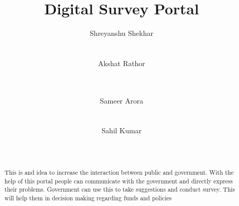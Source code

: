 \documentclass{sig-alternate}
\begin{document}
\title{Digital Survey Portal}


%
\author{
\alignauthor Shreyanshu Shekhar\\
       \\
       \\
\alignauthor Akshat Rathor\\
       \\
       \\
\and  
\alignauthor Sameer Arora\\
       \\
       \\
\alignauthor Sahil Kumar\\
       \\
       \\
}




\maketitle
\begin{abstract}
This is and idea to increase the interaction between
public and government. With the help of this portal people can
communicate with the government and directly express their
problems. Government can use this to take suggestions and
conduct survey. This will help them in decision making regarding
funds and policies
\end{abstract}
\end{document}
